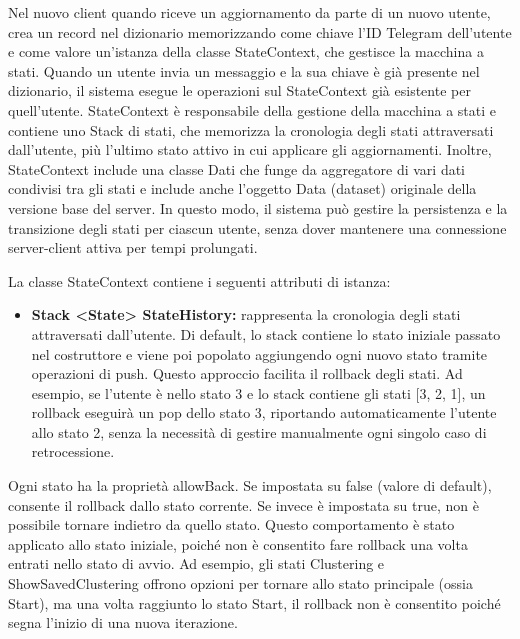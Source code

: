 \begin{enumerate}
    Nel nuovo client quando riceve un aggiornamento da parte di un nuovo utente, crea un record nel dizionario memorizzando come chiave l'ID Telegram dell'utente e come valore un'istanza della classe StateContext, che gestisce la macchina a stati. Quando un utente invia un messaggio e la sua chiave è già presente nel dizionario, il sistema esegue le operazioni sul StateContext già esistente per quell'utente. StateContext è responsabile della gestione della macchina a stati e contiene uno Stack di stati, che memorizza la cronologia degli stati attraversati dall'utente, più l'ultimo stato attivo in cui applicare gli aggiornamenti. Inoltre, StateContext include una classe Dati che funge da aggregatore di vari dati condivisi tra gli stati e include anche l'oggetto Data (dataset) originale della versione base del server. In questo modo, il sistema può gestire la persistenza e la transizione degli stati per ciascun utente, senza dover mantenere una connessione server-client attiva per tempi prolungati.
    
    La classe StateContext contiene i seguenti attributi di istanza:
    \begin{itemize}
        \item \textbf{Stack <State> StateHistory:} rappresenta la cronologia degli stati attraversati dall'utente. Di default, lo stack contiene lo stato iniziale passato nel costruttore e viene poi popolato aggiungendo ogni nuovo stato tramite operazioni di push. Questo approccio facilita il rollback degli stati. Ad esempio, se l'utente è nello stato 3 e lo stack contiene gli stati [3, 2, 1], un rollback eseguirà un pop dello stato 3, riportando automaticamente l'utente allo stato 2, senza la necessità di gestire manualmente ogni singolo caso di retrocessione.
    \end{itemize}
    
    Ogni stato ha la proprietà allowBack. Se impostata su false (valore di default), consente il rollback dallo stato corrente. Se invece è impostata su true, non è possibile tornare indietro da quello stato. Questo comportamento è stato applicato allo stato iniziale, poiché non è consentito fare rollback una volta entrati nello stato di avvio. Ad esempio, gli stati Clustering e ShowSavedClustering offrono opzioni per tornare allo stato principale (ossia Start), ma una volta raggiunto lo stato Start, il rollback non è consentito poiché segna l'inizio di una nuova iterazione.
    

\end{enumerate}
